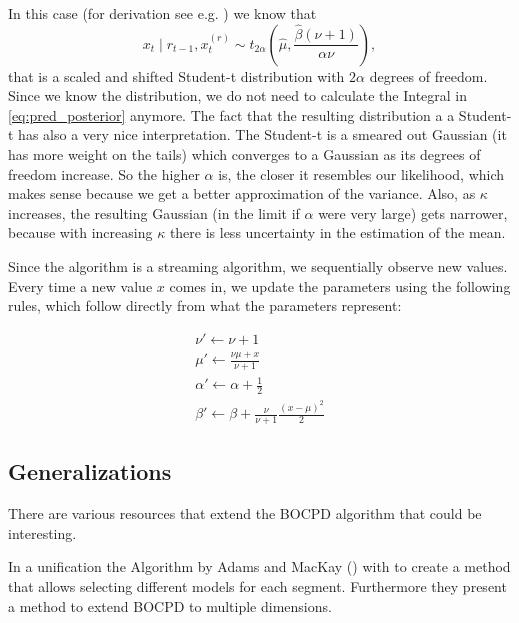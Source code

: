 \documentclass[12pt,a4paper]{article}
\begin{document}
In this case (for derivation see e.g. \cite{Murphy:ConjugateBayesiananalysis}) we know that
\begin{equation} \label{eg:xt_t_distribution}
x_t \mid r_{t-1}, x_{t}^{(r)} \sim t_{2\alpha}\left(\hat\mu, \frac{\hat\beta(\nu + 1)}{\alpha\nu}\right),
\end{equation}
that is a scaled and shifted Student-t distribution with $2\alpha$ degrees of freedom. Since we know the distribution, we do not need to calculate the Integral in \eqref{eq:pred_posterior} anymore. The fact that the resulting distribution a a Student-t has also a very nice interpretation. The Student-t is a smeared out Gaussian (it has more weight on the tails) which converges to a Gaussian as its degrees of freedom increase. So the higher $\alpha$ is, the closer it resembles our likelihood, which makes sense because we get a better approximation of the variance. Also, as $\kappa$ increases, the resulting Gaussian (in the limit if $\alpha$ were very large) gets narrower, because with increasing $\kappa$ there is less uncertainty in the estimation of the mean.

Since the algorithm is a streaming algorithm, we sequentially observe new values. Every time a new value $x$ comes in, we update the parameters using the following rules, which follow directly from what the parameters represent:

\begin{equation*}
\begin{gathered}
\nu' \leftarrow \nu + 1 \\
\mu' \leftarrow \frac{\nu \mu + x}{\nu + 1} \\
\alpha' \leftarrow \alpha + \frac12 \\
\beta' \leftarrow \beta + \frac{\nu}{\nu + 1} \frac{(x - \mu)^2}{2}
\end{gathered}
\end{equation*}

\subsection{Generalizations}
There are various resources that extend the BOCPD algorithm that could be interesting. 

In \cite{Knoblauch:SpatiotemporalBayesian} a unification the Algorithm by Adams and MacKay (\cite{Adams:BayesianOnlineChangepoint}) with \cite{Fearnhead:lineinferencemultiple} to create a method that allows selecting different models for each segment. Furthermore they present a method to extend BOCPD to multiple dimensions.
\end{document}
